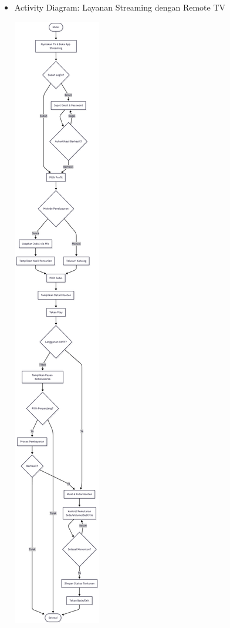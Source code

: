 \documentclass[a4paper]{article}
\begin{document}
\begin{enumerate}[itemsep=1em]
  \pagebreak

  \begin{itemize}[itemsep=1em]
    \item Activity Diagram: Layanan Streaming dengan Remote TV
    \begin{center}
      \includegraphics[height=0.9\textheight,keepaspectratio]{streaming-activity-diagram.png}
    \end{center}
  \end{itemize}
  

\end{enumerate}
\end{document}
